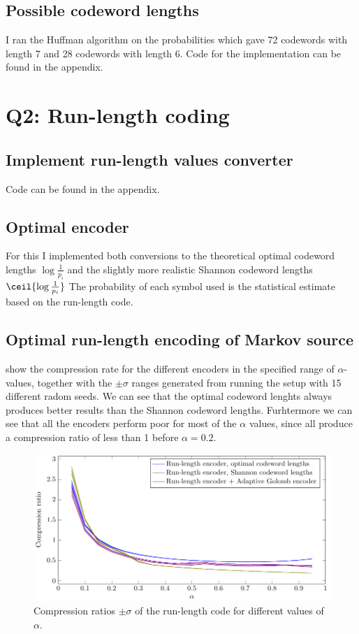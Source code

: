 \documentclass{article}
\begin{document}
\subsection{Possible codeword lengths}
I ran the Huffman algorithm on the probabilities which gave
72 codewords with length 7 
and 28 codewords with length 6.
Code for the implementation can be found in the appendix.

\section{Q2: Run-length coding}

\subsection{Implement run-length values converter}
Code can be found in the appendix.

\subsection{Optimal encoder}
For this I implemented both conversions to the theoretical optimal codeword lengths
$\log\frac{1}{p_i}$ and the slightly more realistic Shannon codeword lengths
$\ceil{\log\frac{1}{p_i}}$
The probability of each symbol used is the statistical estimate based on the run-length code.

\subsection{Optimal run-length encoding of Markov source}
 show the compression rate for the different encoders
in the specified range of $\alpha$-values,
together with the $\pm\sigma$ ranges generated from running the setup with 15 different radom seeds.
We can see that the optimal codeword lenghts always produces better results than the Shannon codeword lengths.
Furhtermore we can see that all the encoders perform poor for most of the $\alpha$ values,
since all produce a compression ratio of less than 1 before $\alpha = 0.2$.
\begin{figure}[!ht]
  \centering
  \includegraphics{../tikz/compression_optimal/optimal_run_length.pdf}
  \caption{Compression ratios $\pm\sigma$ of the run-length code for different values of $\alpha$.}
  \label{fig:comprratio}
\end{figure}
\end{document}
